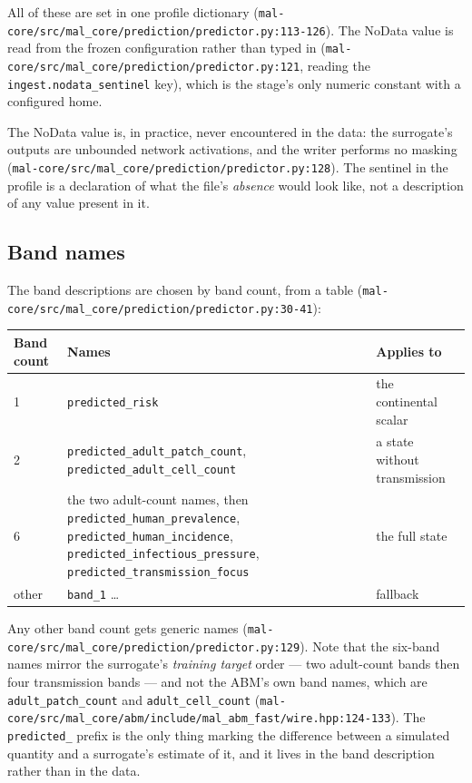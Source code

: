 \documentclass[11pt,a4paper]{article}
\newcommand{\code}[1]{\texttt{#1}}
\begin{document}
All of these are set in one profile dictionary
(\code{mal-core/src/mal\_core/prediction/predictor.py:113-126}). The NoData
value is read from the frozen configuration rather than typed in
(\code{mal-core/src/mal\_core/prediction/predictor.py:121}, reading the
\code{ingest.nodata\_sentinel} key), which is the stage's only numeric
constant with a configured home.

The NoData value is, in practice, never encountered in the data: the
surrogate's outputs are unbounded network activations, and the writer performs
no masking
(\code{mal-core/src/mal\_core/prediction/predictor.py:128}). The sentinel in
the profile is a declaration of what the file's \emph{absence} would look
like, not a description of any value present in it.

\subsection{Band names}

The band descriptions are chosen by band count, from a table
(\code{mal-core/src/mal\_core/prediction/predictor.py:30-41}):

\begin{center}
\begin{tabular}{@{}llp{7cm}@{}}
\toprule
Band count & Names & Applies to \\
\midrule
1 & \code{predicted\_risk} & the continental scalar \\
2 & \code{predicted\_adult\_patch\_count}, \code{predicted\_adult\_cell\_count}
  & a state without transmission \\
6 & the two adult-count names, then \code{predicted\_human\_prevalence},
  \code{predicted\_human\_incidence}, \code{predicted\_infectious\_pressure},
  \code{predicted\_transmission\_focus} & the full state \\
other & \code{band\_1} \dots & fallback \\
\bottomrule
\end{tabular}
\end{center}

Any other band count gets generic names
(\code{mal-core/src/mal\_core/prediction/predictor.py:129}). Note that the
six-band names mirror the surrogate's \emph{training target} order --- two
adult-count bands then four transmission bands --- and not the ABM's own band
names, which are \code{adult\_patch\_count} and \code{adult\_cell\_count}
(\code{mal-core/src/mal\_core/abm/include/mal\_abm\_fast/wire.hpp:124-133}).
The \code{predicted\_} prefix is the only thing marking the difference
between a simulated quantity and a surrogate's estimate of it, and it lives
in the band description rather than in the data.
\end{document}

